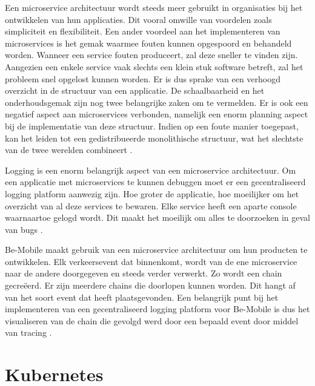 Een microservice architectuur wordt steeds meer gebruikt in organisaties bij het ontwikkelen van hun applicaties. Dit vooral omwille van voordelen zoals simpliciteit en flexibiliteit. Een ander voordeel aan het implementeren van microservices is het gemak waarmee fouten kunnen opgespoord en behandeld worden. Wanneer een service fouten produceert, zal deze sneller te vinden zijn. Aangezien een enkele service vaak slechts een klein stuk software betreft, zal het probleem snel opgelost kunnen worden. Er is dus sprake van een verhoogd overzicht in de structuur van een applicatie. De schaalbaarheid en het onderhoudsgemak zijn nog twee belangrijke zaken om te vermelden. Er is ook een negatief aspect aan microservices verbonden, namelijk een enorm planning aspect bij de implementatie van deze structuur. Indien op een foute manier toegepast, kan het leiden tot een gedistribueerde monolithische structuur, wat het slechtste van de twee werelden combineert \autocite{Carey2018}. 

Logging is een enorm belangrijk aspect van een microservice architectuur. Om een applicatie met microservices te kunnen debuggen moet er een gecentraliseerd logging platform aanwezig zijn. Hoe groter de applicatie, hoe moeilijker om het overzicht van al deze services te bewaren. Elke service heeft een aparte console waarnaartoe gelogd wordt. Dit maakt het moeilijk om alles te doorzoeken in geval van bugs \autocite{SourceFuse2018}. 

Be-Mobile maakt gebruik van een microservice architectuur om hun producten te ontwikkelen. Elk verkeersevent dat binnenkomt, wordt van de ene microservice naar de andere doorgegeven en steeds verder verwerkt. Zo wordt een chain gecreëerd. Er zijn meerdere chains die doorlopen kunnen worden. Dit hangt af van het soort event dat heeft plaatsgevonden. Een belangrijk punt bij het implementeren van een gecentraliseerd logging platform voor Be-Mobile is dus het visualiseren van de chain die gevolgd werd door een bepaald event door middel van tracing \autocite{jens2019}.

\section{Kubernetes}
\label{sec:kubernetes}

